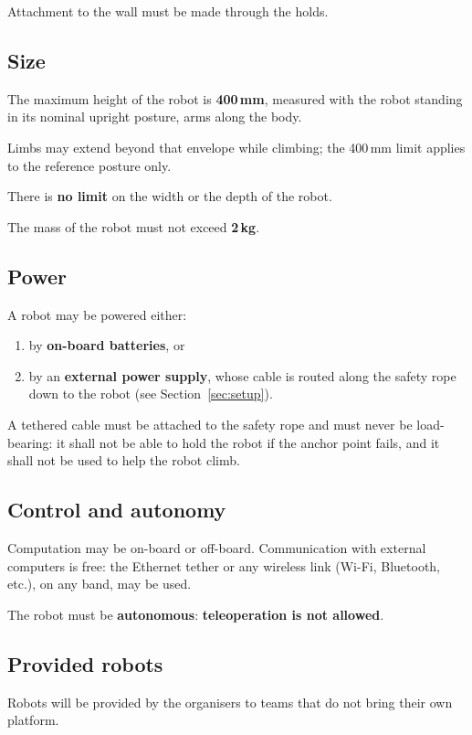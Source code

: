 \documentclass[11pt,a4paper]{article}
\begin{document}
Attachment to the wall must be made through the holds.

\subsection{Size}

The maximum height of the robot is \textbf{400\,mm}, measured with the
robot standing in its nominal upright posture, arms along the body.

Limbs may extend beyond that envelope while climbing; the 400\,mm limit
applies to the reference posture only.

There is \textbf{no limit} on the width or the depth of the robot.

The mass of the robot must not exceed \textbf{2\,kg}.

\subsection{Power}

A robot may be powered either:
\begin{enumerate}[label=(\alph*)]
  \item by \textbf{on-board batteries}, or
  \item by an \textbf{external power supply}, whose cable is routed along the
        safety rope down to the robot (see Section~\ref{sec:setup}).
\end{enumerate}

A tethered cable must be attached to the safety rope and must never be
load-bearing: it shall not be able to hold the robot if the anchor point fails, and
it shall not be used to help the robot climb.

\subsection{Control and autonomy}

Computation may be on-board or off-board.
Communication with external computers is free: the Ethernet tether or any
wireless link (Wi-Fi, Bluetooth, etc.), on any band, may be used.

The robot must be \textbf{autonomous}: \textbf{teleoperation is not allowed}.

\subsection{Provided robots}

Robots will be provided by the organisers to teams that do not bring their
own platform.
\end{document}
